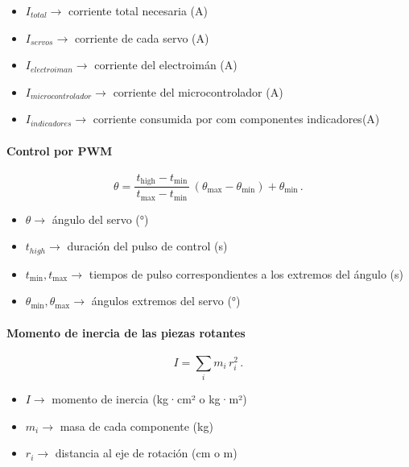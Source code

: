 \begin{itemize}
  \item $I_{{total}} \rightarrow$ corriente total necesaria (A)
  \item $I_{{servos}} \rightarrow$ corriente de cada servo (A)
  \item $I_{{electroiman}} \rightarrow$ corriente del electroimán (A)
  \item $I_{{microcontrolador}} \rightarrow$ corriente del microcontrolador (A)
  \item $I_{{indicadores}} \rightarrow$ corriente consumida por com componentes indicadores(A)
\end{itemize}

\cite{openstax_kcl_2022}

\paragraph{Control por PWM}
\begin{equation}
  \theta = \frac{t_{\mathrm{high}}-t_{\min}}{\,t_{\max}-t_{\min}\,}\,(\theta_{\max}-\theta_{\min}) + \theta_{\min} \,.\,
\end{equation}

\begin{itemize}
  \item $\theta \rightarrow$ ángulo del servo (°)
  \item $t_{{high}} \rightarrow$ duración del pulso de control (s)
  \item $t_{{\min}}, t_{{\max}} \rightarrow$ tiempos de pulso correspondientes a los extremos del ángulo (s)
  \item $\theta_{{\min}}, \theta_{{\max}} \rightarrow$ ángulos extremos del servo (°)
\end{itemize}

\cite{wiki_lerp_2025,servocity_servofaq}


\paragraph{Momento de inercia de las piezas rotantes}
\begin{equation}
  I = \sum_i m_i\,r_i^{2} \,.\,
\end{equation}

\begin{itemize}
  \item $I \rightarrow$ momento de inercia (kg·cm² o kg·m²)
  \item $m_i \rightarrow$ masa de cada componente (kg)
  \item $r_i \rightarrow$ distancia al eje de rotación (cm o m)
\end{itemize}

